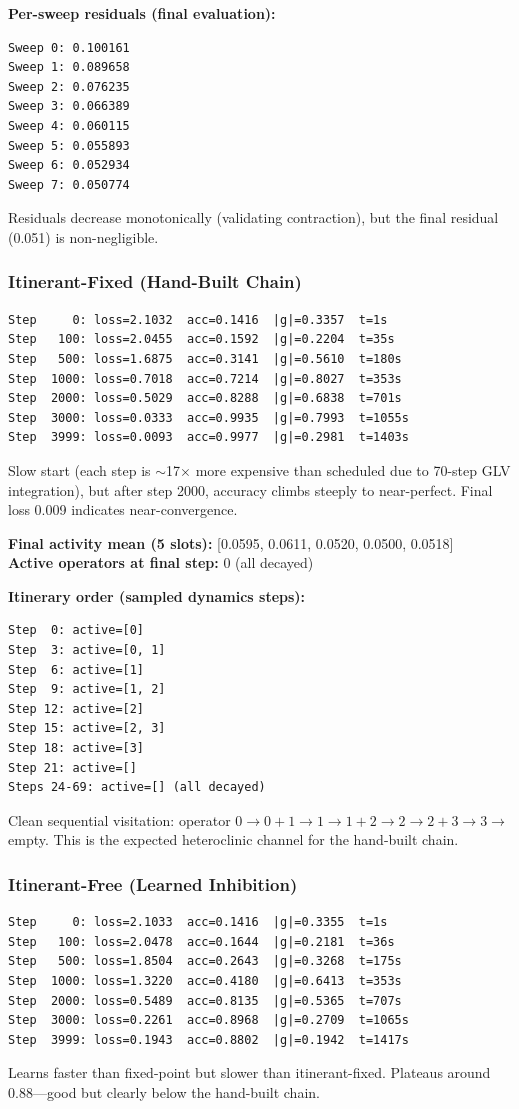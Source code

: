 \documentclass[11pt]{article}
\begin{document}
\textbf{Per-sweep residuals (final evaluation):}
\begin{lstlisting}
Sweep 0: 0.100161
Sweep 1: 0.089658
Sweep 2: 0.076235
Sweep 3: 0.066389
Sweep 4: 0.060115
Sweep 5: 0.055893
Sweep 6: 0.052934
Sweep 7: 0.050774
\end{lstlisting}
Residuals decrease monotonically (validating contraction), but the final residual (0.051) is non-negligible.

\subsubsection*{Itinerant-Fixed (Hand-Built Chain)}
\begin{lstlisting}
Step     0: loss=2.1032  acc=0.1416  |g|=0.3357  t=1s
Step   100: loss=2.0455  acc=0.1592  |g|=0.2204  t=35s
Step   500: loss=1.6875  acc=0.3141  |g|=0.5610  t=180s
Step  1000: loss=0.7018  acc=0.7214  |g|=0.8027  t=353s
Step  2000: loss=0.5029  acc=0.8288  |g|=0.6838  t=701s
Step  3000: loss=0.0333  acc=0.9935  |g|=0.7993  t=1055s
Step  3999: loss=0.0093  acc=0.9977  |g|=0.2981  t=1403s
\end{lstlisting}
Slow start (each step is $\sim$17$\times$ more expensive than scheduled due to 70-step GLV integration), but after step 2000, accuracy climbs steeply to near-perfect. Final loss 0.009 indicates near-convergence.

\textbf{Final activity mean (5 slots):} [0.0595, 0.0611, 0.0520, 0.0500, 0.0518] \\
\textbf{Active operators at final step:} 0 (all decayed)

\textbf{Itinerary order (sampled dynamics steps):}
\begin{lstlisting}
Step  0: active=[0]
Step  3: active=[0, 1]
Step  6: active=[1]
Step  9: active=[1, 2]
Step 12: active=[2]
Step 15: active=[2, 3]
Step 18: active=[3]
Step 21: active=[]
Steps 24-69: active=[] (all decayed)
\end{lstlisting}
Clean sequential visitation: operator $0 \to 0{+}1 \to 1 \to 1{+}2 \to 2 \to 2{+}3 \to 3 \to$ empty. This is the expected heteroclinic channel for the hand-built chain.

\subsubsection*{Itinerant-Free (Learned Inhibition)}
\begin{lstlisting}
Step     0: loss=2.1033  acc=0.1416  |g|=0.3355  t=1s
Step   100: loss=2.0478  acc=0.1644  |g|=0.2181  t=36s
Step   500: loss=1.8504  acc=0.2643  |g|=0.3268  t=175s
Step  1000: loss=1.3220  acc=0.4180  |g|=0.6413  t=353s
Step  2000: loss=0.5489  acc=0.8135  |g|=0.5365  t=707s
Step  3000: loss=0.2261  acc=0.8968  |g|=0.2709  t=1065s
Step  3999: loss=0.1943  acc=0.8802  |g|=0.1942  t=1417s
\end{lstlisting}
Learns faster than fixed-point but slower than itinerant-fixed. Plateaus around 0.88---good but clearly below the hand-built chain.
\end{document}
